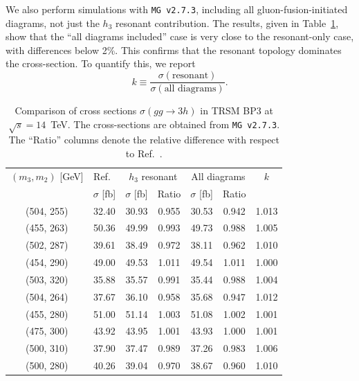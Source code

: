 \documentclass[12pt]{article}
\begin{document}
        We also perform simulations with \texttt{MG v2.7.3}, including all gluon-fusion-initiated diagrams, not just the $h_3$ resonant contribution. The results, given in Table~\ref{tab:trsm_xs_comparison_v2}, show that the ``all diagrams included'' case is very close to the resonant-only case, with differences below 2\%. This confirms that the resonant topology dominates the cross-section. To quantify this, we report
        \[
            k \equiv \frac{\sigma(\text{resonant})}{\sigma(\text{all diagrams})}.
        \]
        \begin{table}[htpb]
            \centering
            \caption{Comparison of cross sections $\sigma(gg \to 3h)$ in TRSM BP3 at $\sqrt{s} = 14$~TeV. The cross-sections are obtained from \texttt{MG v2.7.3}. The ``Ratio'' columns denote the relative difference with respect to Ref.~\cite{Papaefstathiou:2020lyp}.}
            \label{tab:trsm_xs_comparison_v2}
            \begin{tabular}{c|c|cc|cc|c}
                $(m_3, m_2)$ [GeV] & Ref.~\cite{Papaefstathiou:2020lyp} & \multicolumn{2}{c|}{$h_3$ resonant} & \multicolumn{2}{c|}{All diagrams} & $k$ \\ \cline{2-7} 
                                   & $\sigma$ [fb] & $\sigma$ [fb] & Ratio & $\sigma$ [fb] & Ratio &  \\ \hline
                (504, 255) & 32.40 & 30.93 & 0.955 & 30.53 & 0.942 & 1.013 \\
                (455, 263) & 50.36 & 49.99 & 0.993 & 49.73 & 0.988 & 1.005 \\
                (502, 287) & 39.61 & 38.49 & 0.972 & 38.11 & 0.962 & 1.010 \\
                (454, 290) & 49.00 & 49.53 & 1.011 & 49.54 & 1.011 & 1.000 \\
                (503, 320) & 35.88 & 35.57 & 0.991 & 35.44 & 0.988 & 1.004 \\
                (504, 264) & 37.67 & 36.10 & 0.958 & 35.68 & 0.947 & 1.012 \\
                (455, 280) & 51.00 & 51.14 & 1.003 & 51.08 & 1.002 & 1.001 \\
                (475, 300) & 43.92 & 43.95 & 1.001 & 43.93 & 1.000 & 1.001 \\
                (500, 310) & 37.90 & 37.47 & 0.989 & 37.26 & 0.983 & 1.006 \\
                (500, 280) & 40.26 & 39.04 & 0.970 & 38.67 & 0.960 & 1.010
            \end{tabular}
        \end{table}
        
\end{document}
